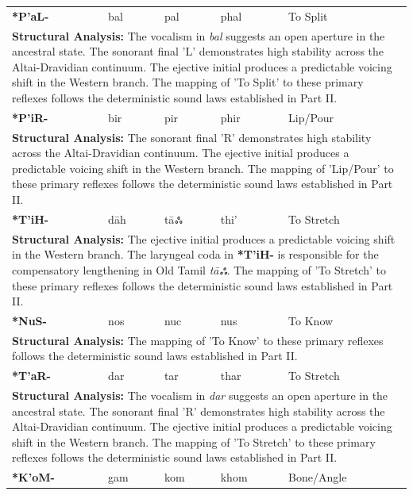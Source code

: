 \begin{longtable}{p{} p{} p{} p{} p{}}
\textbf{*P'aL-} & bal & pal & phal & To Split \\ 
\multicolumn{5}{p{\textwidth}}{\small \textbf{Structural Analysis:} The vocalism in \textit{bal} suggests an open aperture in the ancestral state. The sonorant final 'L' demonstrates high stability across the Altai-Dravidian continuum. The ejective initial produces a predictable voicing shift in the Western branch. The mapping of 'To Split' to these primary reflexes follows the deterministic sound laws established in Part II.} \\ \addlinespace[15pt] 
\textbf{*P'iR-} & bir & pir & phir & Lip/Pour \\ 
\multicolumn{5}{p{\textwidth}}{\small \textbf{Structural Analysis:} The sonorant final 'R' demonstrates high stability across the Altai-Dravidian continuum. The ejective initial produces a predictable voicing shift in the Western branch. The mapping of 'Lip/Pour' to these primary reflexes follows the deterministic sound laws established in Part II.} \\ \addlinespace[15pt] 
\textbf{*T'iH-} & dāh & tāஃ & thi' & To Stretch \\ 
\multicolumn{5}{p{\textwidth}}{\small \textbf{Structural Analysis:} The ejective initial produces a predictable voicing shift in the Western branch. The laryngeal coda in \textbf{*T'iH-} is responsible for the compensatory lengthening in Old Tamil \textit{tāஃ}. The mapping of 'To Stretch' to these primary reflexes follows the deterministic sound laws established in Part II.} \\ \addlinespace[15pt] 
\textbf{*NuS-} & nos & nuc & nus & To Know \\ 
\multicolumn{5}{p{\textwidth}}{\small \textbf{Structural Analysis:}  The mapping of 'To Know' to these primary reflexes follows the deterministic sound laws established in Part II.} \\ \addlinespace[15pt] 
\textbf{*T'aR-} & dar & tar & thar & To Stretch \\ 
\multicolumn{5}{p{\textwidth}}{\small \textbf{Structural Analysis:} The vocalism in \textit{dar} suggests an open aperture in the ancestral state. The sonorant final 'R' demonstrates high stability across the Altai-Dravidian continuum. The ejective initial produces a predictable voicing shift in the Western branch. The mapping of 'To Stretch' to these primary reflexes follows the deterministic sound laws established in Part II.} \\ \addlinespace[15pt] 
\textbf{*K'oM-} & gam & kom & khom & Bone/Angle \\ 

\end{longtable}
